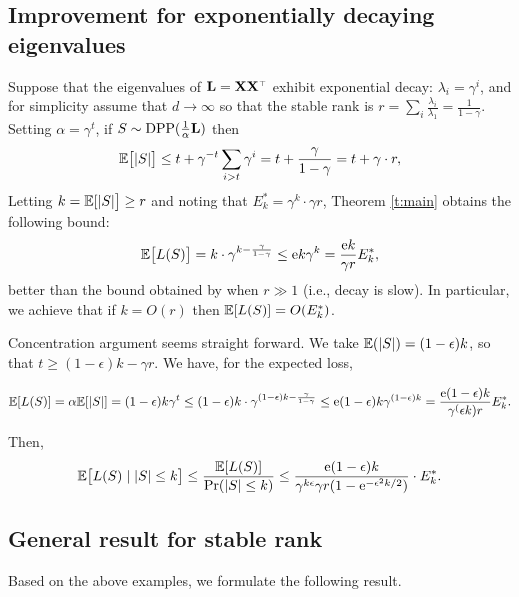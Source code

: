 \documentclass[12pt]{sty/colt2019/colt2018-arxiv}
\begin{document}
  
\subsection{Improvement for exponentially decaying eigenvalues}
Suppose that the eigenvalues of $\L=\X\X^\top$
exhibit exponential decay: $\lambda_i=\gamma^{i}$, and for
simplicity assume that $d\rightarrow\infty$ so that the stable rank is 
$r=\sum_i\frac{\lambda_i}{\lambda_1} = \frac1{1-\gamma}$. Setting $\alpha =
\gamma^t$, if $S\sim{\mathrm{DPP}}(\frac1\alpha\mathbf{L})$ then
\begin{align*}
  \mathbb E\big[|S|\big] \leq t + \gamma^{-t}\sum_{i>t}\gamma^i =
  t + \frac\gamma{1-\gamma} = t +\gamma\cdot r,
\end{align*}
Letting $k=\mathbb E[|S|\big]\geq r$ and noting that
$E_k^*=\gamma^k\cdot\gamma r$, Theorem \ref{t:main} obtains the following bound: 
\begin{align*}
  \mathbb E\big[L(S)\big] = k\cdot \gamma^{k-\frac\gamma{1-\gamma}}\leq \mathrm{e}
  k\gamma^k = \frac{\mathrm{e} k}{\gamma r}E_k^*,
\end{align*}
better than the bound obtained by \cite{pca-volume-sampling}
when $r\gg 1$ (i.e., decay is slow). In particular, we
achieve that if $k = O(r)$ then $\mathbb E[L(S)] = O(E_k^*)$.


 
 Concentration argument seems straight forward. We take $\mathbb E(|S|) = (1-\epsilon)k$, so that $t \geq (1-\epsilon)k - \gamma r$. We have, 
 for the expected loss, 
 
 \begin{align*}
 \mathbb E[L(S)] = \alpha \mathbb E[|S|] =  (1- \epsilon) k \gamma^t \leq  (1- \epsilon)k\cdot \gamma^{(1-\epsilon)k-\frac\gamma{1-\gamma}}\leq \mathrm{e}
  (1- \epsilon)k\gamma^{(1-\epsilon)k} = \frac{\mathrm{e}  (1- \epsilon)k}{\gamma^(\epsilon k) r}E_k^* .
 \end{align*}
 
 Then, 
 \begin{align*}
 \mathbb E\big[L(S)\mid |S|\leq k\big] \leq \frac{\mathbb E[L(S)]}{\mathrm{Pr}(|S|\leq k)}
 \leq \frac{\mathrm{e}  (1- \epsilon)k}{\gamma^{k\epsilon}\gamma r(1-\mathrm{e}^{-\epsilon^2k/2})}\cdot E_k^*.
 \end{align*}

 
\subsection{General result for stable rank} 
Based on the above examples, we formulate the following result.
\end{document}
